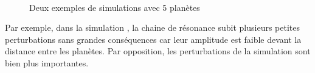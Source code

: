 
\begin{figure}[htb]
\centering
{}\\
\caption{Deux exemples de simulations avec 5 planètes}\label{fig:timed-resonance-stability}
\end{figure}

Par exemple, dans la simulation , la chaine de  résonance subit plusieurs petites perturbations sans grandes conséquences car leur amplitude est faible devant la distance entre les planètes. Par opposition, les perturbations de la simulation   sont bien plus importantes.

